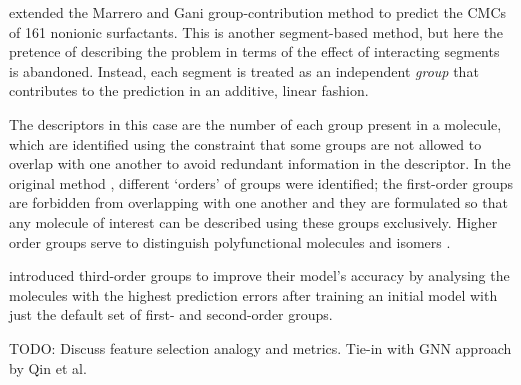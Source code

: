 \citet{matteiModelingCriticalMicelle2013} extended the Marrero and Gani
group-contribution method \cite{ganiAutomaticCreationMissing2005} to predict the
CMCs of 161 nonionic surfactants. This is another segment-based method, but here
the pretence of describing the problem in terms of the effect of interacting
segments is abandoned. Instead, each segment is treated as an independent
\emph{group} that contributes to the prediction in an additive, linear fashion.

The descriptors in this case are the number of each group present in a molecule,
which are identified using the constraint that some groups are not allowed to
overlap with one another to avoid redundant information in the descriptor. In
the original method \cite{ganiAutomaticCreationMissing2005}, different `orders'
of groups were identified; the first-order groups are forbidden from overlapping
with one another and they are formulated so that any molecule of interest can be
described using these groups exclusively. Higher order groups serve to
distinguish polyfunctional molecules and isomers
\cite{ganiAutomaticCreationMissing2005}.

\citet{matteiModelingCriticalMicelle2013} introduced third-order groups to
improve their model's accuracy by analysing the molecules with the highest
prediction errors after training an initial model with just the default set of
first- and second-order groups.

TODO: Discuss feature selection analogy and metrics. Tie-in with GNN approach by Qin et al.